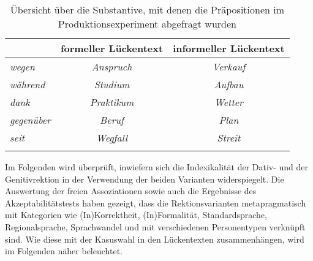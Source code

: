 \begin{table}
\centering
\begin{tabular}{lcc}
\lsptoprule
\textit{\textbf{}} & formeller Lückentext & informeller Lückentext \\ \midrule
\textit{wegen}     & \textit{Anspruch}             & \textit{Verkauf}                \\ %
\textit{während}   & \textit{Studium}              & \textit{Aufbau}                 \\ %
\textit{dank}      & \textit{Praktikum}            & \textit{Wetter}                 \\ %
\textit{gegenüber} & \textit{Beruf}                & \textit{Plan}                   \\ %
\textit{seit}      & \textit{Wegfall}              & \textit{Streit}                 \\ 
\lspbottomrule
\end{tabular}
\caption{Übersicht über die Substantive, mit denen die Präpositionen im Produktionsexperiment abgefragt wurden}
\label{table:ProdBsp}
\end{table}

Im Folgenden wird überprüft, inwiefern sich die Indexikalität der Dativ- und der Genitivrektion in der Verwendung der beiden Varianten widerspiegelt. 
Die Auswertung der freien Assoziationen sowie auch die Ergebnisse des Akzeptabilitätstests haben gezeigt, dass die Rektionsvarianten metapragmatisch mit Kategorien wie (In)Korrektheit, (In)Formalität, Standardsprache, Regionalsprache, Sprachwandel und mit verschiedenen Personentypen verknüpft sind. 
Wie diese mit der Kasuswahl in den Lückentexten zusammenhängen, wird im Folgenden näher beleuchtet. 

